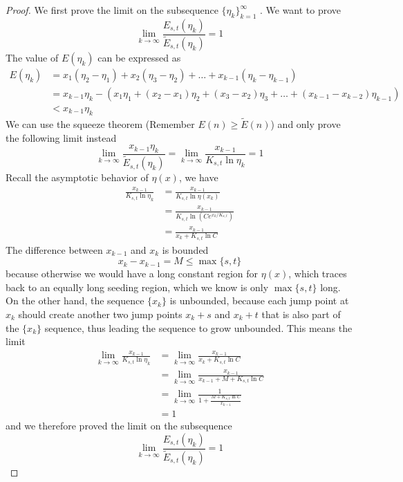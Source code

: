 \documentclass[]{article}
\begin{document}
\begin{proof}
	We first prove the limit on the subsequence $\{\eta_k\}_{k=1}^{\infty}$ . We want to prove 
	\[
	\lim_{k\to\infty}\frac{E_{s,t}(\eta_k)}{\tilde{E}_{s,t}(\eta_k)} = 1
	\]
	The value of $E(\eta_k)$ can be expressed as 
	\begin{align*}
	E(\eta_k) &= x_1 (\eta_2 - \eta_1) + x_2 (\eta_3 - \eta_2) + \dots +x_{k-1} (\eta_k - \eta_{k-1})\\
	&=  x_{k-1}\eta_k - (x_1 \eta_1 + (x_2 - x_1) \eta_2 + (x_3 - x_2)\eta_3 + \dots + (x_{k-1} - x_{k-2}) \eta_{k-1}) \\
	&< x_{k-1}\eta_k
	\end{align*}
	We can use the squeeze theorem (Remember $E(n) \ge \tilde{E}(n)$) and only prove the following limit instead
	\[
	\lim_{k\to\infty}\frac{x_{k-1}\eta_k}{\tilde{E}_{s,t}(\eta_k)} = \lim_{k\to\infty}\frac{x_{k-1}}{K_{s,t}\ln\eta_k} = 1
	\]
	Recall the asymptotic behavior of $\eta(x)$, we have
	\begin{align*}
	\frac{x_{k-1}}{K_{s,t}\ln\eta_k} &= \frac{x_{k-1}}{K_{s,t}\ln\eta(x_k)} \\
	&=\frac{x_{k-1}}{K_{s,t}\ln\left(C e^{x_k/K_{s,t}}\right)}\\
	&=\frac {x_{k-1}}{x_k +K_{s,t}\ln C }
	\end{align*}
	The difference between $x_{k-1}$ and $x_k$ is bounded
	\[
	x_k - x_{k-1} = M \le \max\{s, t\}
	\]	
	because otherwise we would have a long constant region for $\eta(x)$, which traces back to an equally long seeding region, which we know is only $\max\{s, t\}$ long. On the other hand, the sequence $\{x_k\}$ is unbounded, because each jump point at $x_k$ should create another two jump points $x_k+s$ and $x_k+t$ that is also part of the $\{x_k\}$ sequence, thus leading the sequence to grow unbounded. This means the limit 
	\begin{align*}
	\lim_{k\to\infty}\frac{x_{k-1}}{K_{s,t}\ln\eta_k} &= \lim_{k\to\infty}\frac {x_{k-1}}{x_k +K_{s,t}\ln C } \\
	&= \lim_{k\to\infty}\frac {x_{k-1}}{x_{k-1} + M +K_{s,t}\ln C }\\
	&= \lim_{k\to\infty}\frac {1}{1 + \frac{M +K_{s,t}\ln C}{x_{k-1}} } \\
	&=1
	\end{align*}
	and we therefore proved the limit on the subsequence
	\[
	\lim_{k\to\infty}\frac{E_{s,t}(\eta_k)}{\tilde{E}_{s,t}(\eta_k)} = 1
	\]
	

\end{proof}
\end{document}
